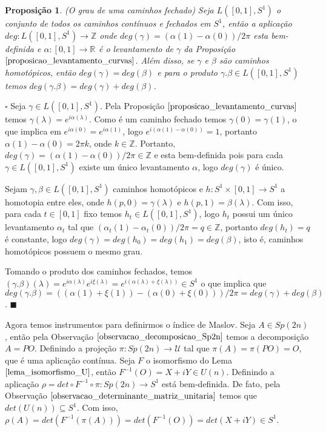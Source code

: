 \documentclass[12pt]{book}
\newtheorem{proposicao}[teorema]{Proposição}
\newenvironment{prova}[1]{$\square$ #1}{\hfill$\blacksquare$}
\newcommand{\caminhosfechadoscirculo}[2]{L([#1,#2], S^{1})}
\newcommand{\gruposimpletico}[1]{Sp(#1)}
\newcommand{\matrizunitaria}[1]{U(#1)}
\newcommand{\real}[1]{\mathbb{R}^{#1}}
\begin{document}
	\begin{proposicao}
		(O grau de uma caminhos fechado) Seja $\caminhosfechadoscirculo{0}{1}$ o conjunto de todos os caminhos contínuos e fechados em $S^{1}$, então a aplicação $deg:\caminhosfechadoscirculo{0}{1} \to \mathbb{Z}$ onde $deg(\gamma) = (\alpha(1)-\alpha(0))/2\pi$ esta bem-definida e $\alpha:[0,1] \to \real{}$ é o levantamento de $\gamma$ da Proposição $\ref{proposicao_levantamento_curvas}$. Além disso, se $\gamma$ e $\beta$ são caminhos homotópicos, então $deg(\gamma)=deg(\beta)$ e para o produto $\gamma.\beta \in \caminhosfechadoscirculo{0}{1}$ temos $deg(\gamma.\beta) = deg(\gamma)+deg(\beta)$.
	\end{proposicao}
	\begin{prova}
		Seja $\gamma \in \caminhosfechadoscirculo{0}{1}$. Pela Proposição $\ref{proposicao_levantamento_curvas}$ temos $\gamma(\lambda) = e^{i\alpha(\lambda)}$. Como é um caminho fechado temos $\gamma(0)=\gamma(1)$, o que implica em $e^{i\alpha(0)}=e^{i\alpha(1)}$, logo $e^{i(\alpha(1)-\alpha(0))} = 1$, portanto $\alpha(1)-\alpha(0) = 2\pi k$, onde $k\in \mathbb{Z}$. Portanto, $deg(\gamma) = (\alpha(1)-\alpha(0))/2\pi \in \mathbb{Z}$ e esta bem-definida pois para cada $\gamma \in \caminhosfechadoscirculo{0}{1}$ existe um único levantamento $\alpha$, logo $deg(\gamma)$ é único.
		
		Sejam $\gamma, \beta \in \caminhosfechadoscirculo{0}{1}$ caminhos homotópicos e $h:S^{1}\times [0,1]\to S^{1}$ a homotopia entre eles, onde $h(p,0) = \gamma(\lambda)$ e $h(p,1) = \beta(\lambda)$. Com isso, para cada $t \in [0,1]$ fixo temos $h_{t} \in \caminhosfechadoscirculo{0}{1}$, logo $h_{t}$ possui um único levantamento $\alpha_{t}$ tal que $(\alpha_{t}(1)-\alpha_{t}(0))/2\pi = q \in \mathbb{Z}$, portanto $deg(h_{t})=q$ é constante, logo $deg(\gamma)=deg(h_{0})=deg(h_{1})=deg(\beta)$, isto é, caminhos homotópicos possuem o mesmo grau. 
		
		Tomando o produto dos caminhos fechados, temos $(\gamma.\beta)(\lambda)= e^{i\alpha(\lambda)}e^{i\xi(\lambda)} = e^{i(\alpha(\lambda)+\xi(\lambda))} \in S^{1}$ o que implica que $deg(\gamma.\beta) = ((\alpha(1)+\xi(1))-(\alpha(0)+\xi(0)))/2\pi = deg(\gamma)+deg(\beta)$.
	\end{prova}
	
	
	Agora temos instrumentos para definirmos o índice de Maslov. Seja $A\in \gruposimpletico{2n}$, então pela Observação $\ref{observacao_decomposicao_Sp2n}$ temos a decomposição $A=PO$. Definindo a projeção $\pi:\gruposimpletico{2n}\to \mathcal{U}$ tal que $\pi(A) = \pi(PO) = O$, que é uma aplicação contínua. Seja $F$ o isomorfismo do Lema $\ref{lema_isomorfismo_U}$, então $F^{-1}(O) = X+iY \in \matrizunitaria{n}$. Definindo a aplicação $\rho = det\circ F^{-1}\circ \pi :\gruposimpletico{2n} \to S^{1}$ está bem-definida. De fato, pela Observação $\ref{observacao_determinante_matriz_unitaria}$ temos que $det(\matrizunitaria{n}) \subseteq S^{1}$. Com isso, $\rho(A) = det(F^{-1}(\pi(A))) = det(F^{-1}(O)) = det(X+iY) \in S^{1}$.
	
\end{document}
